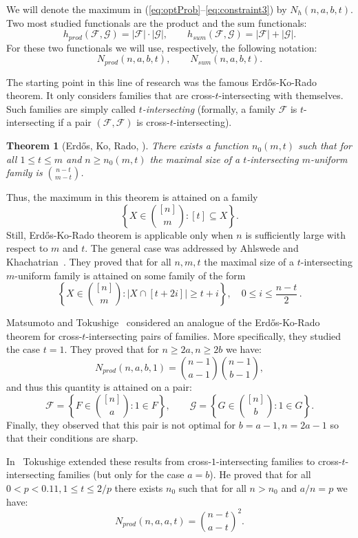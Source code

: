 \documentclass[12pt]{article}
\let\leq\leqslant
\let\geq\geqslant
\let\le\leq
\let\ge\geq
\def\F{{\mathcal F}}
\def\G{{\mathcal G}}
\newtheorem*{known}{Theorem}
\begin{document}
We will denote the maximum in (\ref{eq:optProb}--\ref{eq:constraint3}) by $N_h(n, a, b, t)$. Two most studied functionals are the product and the sum functionals:
$$h_{prod}(\F, \G) = |\F| \cdot |\G|, \qquad h_{sum}(\F, \G) = |\F| + |\G|.$$
For these two functionals we will use, respectively, the following notation:
$$N_{prod}(n, a, b, t), \qquad N_{sum}(n, a, b, t).$$


The starting point  in this line of research was the famous Erd\H{o}s-Ko-Rado
theorem. It only considers families that are cross-$t$-intersecting with themselves. Such families are simply called \emph{$t$-intersecting} (formally, a family $\F$ is  $t$-intersecting if a pair $(\F, \F)$ is cross-$t$-intersecting). 

\begin{known}[Erd\H{o}s, Ko, Rado, \cite{erdos1961intersection}] There exists a function $n_0(m, t)$ such that for all $1\leq t\leq m$ and $n\geq n_0(m,t)$ the maximal size of a
$t$-intersecting $m$-uniform family is $\binom{n-t}{m-t}$. 
\end{known}

Thus, the maximum in this theorem is attained on a family
$$\left\{ X\in\binom{[n]}{m}: [t]\subseteq X\right\}.$$
Still, Erd\H{o}s-Ko-Rado
theorem is applicable only when $n$ is sufficiently large with respect to $m$ and $t$. The general case was addressed by
Ahlswede and Khachatrian~\cite{AKh97}. They proved that for all $n, m, t$ the maximal size of a 
$t$-intersecting $m$-uniform family  is attained on some family of the form
\[ 
\left\{ X\in\binom{[n]}{m}: |X\cap[t+2i]|\geq t+i
\right\}, \quad 0\leq i\leq \frac{n-t}2\,.
\]

Matsumoto and Tokushige~\cite{MATSUMOTO198990} considered  an analogue of the  Erd\H{o}s-Ko-Rado
theorem for cross-$t$-intersecting pairs of  families. More specifically, they studied the case $t = 1$.  They proved that for $n\ge 2a, n\ge 2b$ we have:
\[
 N_{prod}(n,a,b,1) = \binom{n-1}{a-1}   \binom{n-1}{b-1},
\]
 and thus this quantity is attained on a pair:
$$\F = \left\{F\in\binom{[n]}{a} : 1 \in F\right\}, \qquad \G = \left\{G\in\binom{[n]}{b} : 1 \in G\right\}.$$
Finally, they observed that this pair is not optimal for $b = a - 1, n = 2a - 1$ so that their conditions are sharp.

In~\cite{TOKUSHIGE20101167} Tokushige extended these results from cross-$1$-intersecting families to cross-$t$-intersecting families (but only for the case $a = b$). He proved that for all $0 < p < 0.11, 1 \le t\le 2/p$ there exists $n_0$ such that for all $n> n_0$ and $a/n = p$ we have:
\[
 N_{prod}(n,a,a,t) = \binom{n-t}{a-t}^2.
\]
\end{document}
